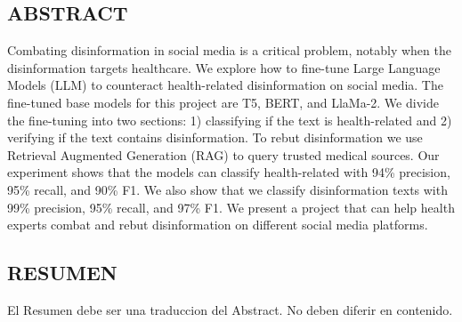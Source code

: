 



\vspace*{0.5in}
\begin{center}
\section*{ABSTRACT}
\end{center}

\noindent
Combating disinformation in social media is a critical problem, notably when the disinformation targets healthcare. We explore how to fine-tune Large Language Models (LLM) to counteract health-related disinformation on social media. The fine-tuned base models for this project are T5, BERT, and LlaMa-2. We divide the fine-tuning into two sections: 1) classifying if the text is health-related and 2) verifying if the text contains disinformation. To rebut disinformation we use Retrieval Augmented Generation (RAG) to query trusted medical sources. Our experiment shows that the models can classify health-related with 94\% precision, 95\% recall, and 90\% F1. We also show that we classify disinformation texts with 99\% precision, 95\% recall, and 97\% F1. We present a project that can help health experts combat and rebut disinformation on different social media platforms.






\newpage





\vspace*{0.5in}
\begin{center}
\section*{RESUMEN}
\end{center}

\noindent
El Resumen debe ser una traduccion del Abstract. No deben diferir en contenido. 
